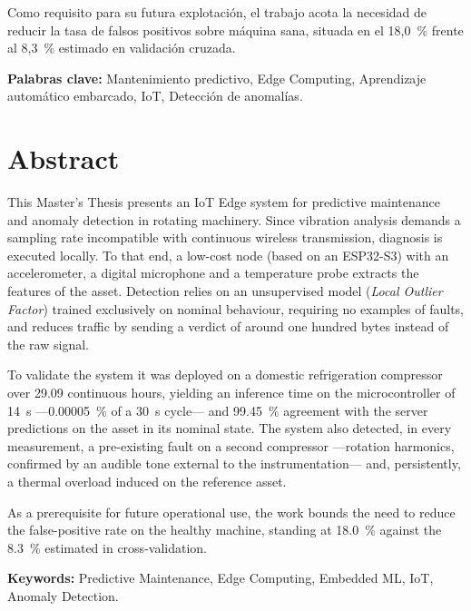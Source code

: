 \documentclass[%
    paper=A4,               %
    twoside,                %
    parskip=full,           %
    12pt,                   %
    titlepage=on,           %
    captions=tableabove,    %
]{book}
\begin{document}
Como requisito para su futura explotación, el trabajo acota la necesidad de reducir la tasa de
falsos positivos sobre máquina sana, situada en el \mbox{18,0 \%} frente al \mbox{8,3 \%} estimado
en validación cruzada.

\textbf{Palabras clave:} Mantenimiento predictivo, Edge Computing, Aprendizaje automático embarcado, IoT, Detección de anomalías.

\vspace{0.1cm}

\section*{Abstract}
This Master's Thesis presents an IoT Edge system for predictive maintenance and anomaly detection
in rotating machinery. Since vibration analysis demands a sampling rate incompatible with
continuous wireless transmission, diagnosis is executed locally. To that end, a low-cost node
(based on an ESP32-S3) with an accelerometer, a digital microphone and a temperature probe
extracts the features of the asset.
Detection relies on an unsupervised model (\textit{Local Outlier Factor}) trained exclusively on
nominal behaviour, requiring no examples of faults, and reduces traffic by sending a verdict of
around one hundred bytes instead of the raw signal.

To validate the system it was deployed on a domestic refrigeration compressor over \mbox{29.09}
continuous hours, yielding an inference time on the microcontroller of \mbox{14 \textmu s}
—\mbox{0.00005 \%} of a \mbox{30 s} cycle— and \mbox{99.45 \%} agreement with the server
predictions on the asset in its nominal state. The system also detected, in every measurement, a pre-existing fault on a second
compressor —rotation harmonics, confirmed by an audible tone external to the instrumentation— and,
persistently, a thermal overload induced on the reference asset.

As a prerequisite for future operational use, the work bounds the need to reduce the false-positive
rate on the healthy machine, standing at \mbox{18.0 \%} against the \mbox{8.3 \%} estimated in
cross-validation.

\textbf{Keywords:} Predictive Maintenance, Edge Computing, Embedded ML, IoT, Anomaly Detection.

\clearemptydoublepage

\tableofcontents
\clearemptydoublepage
\end{document}
